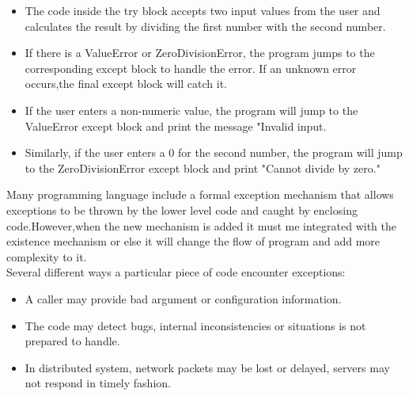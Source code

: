   	\STANDARD{}
  	{
  	\begin{itemize} 
  		\item The code inside the try block accepts two input values from the user and calculates the result by dividing the first number with the second number.
  		\item If there is a ValueError or ZeroDivisionError, the program jumps to the corresponding except block to handle the error. If an unknown error occurs,the final except block will catch it.
  		\item If the user enters a non-numeric value, the program will jump to the ValueError except block and print the message "Invalid input.
  		\item Similarly, if the user enters a 0 for the second number, the program will jump to the ZeroDivisionError except block and print "Cannot divide by zero."
  	\end{itemize}
	}


\STANDARD{}
{ 



Many programming language include a formal exception mechanism that allows exceptions to be thrown by the lower level code and caught by enclosing code.However,when the new mechanism is added it must me integrated with the existence mechanism or else it will change the flow of program and add more complexity to it.\\ \bigskip
Several different ways a particular piece of code encounter exceptions:
\begin{itemize}
	\item A caller may provide bad argument or configuration information.
	\item The code may detect bugs, internal inconsistencies or situations is not prepared to handle.
	\item In distributed system, network packets may be lost or delayed, servers may not respond in timely fashion.
\end{itemize}


}


